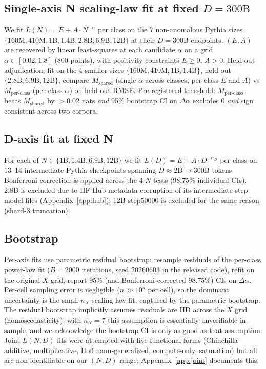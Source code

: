 \documentclass[10pt]{article}
\newcommand{\dalpha}{\Delta\alpha}
\newcommand{\Mp}{M_\mathrm{per\text{-}class}}
\newcommand{\Ms}{M_\mathrm{shared}}
\begin{document}
\subsection{Single-axis N scaling-law fit at fixed $D{=}300\text{B}$}

We fit $L(N) = E + A \cdot N^{-\alpha}$ per class on the 7
non-anomalous Pythia sizes $\{160\text{M}, 410\text{M}, 1\text{B},
1.4\text{B}, 2.8\text{B}, 6.9\text{B}, 12\text{B}\}$ at their
$D{=}300\text{B}$ endpoints. $(E, A)$ are recovered by linear
least-squares at each candidate $\alpha$ on a grid
$\alpha \in [0.02, 1.8]$ (800 points), with positivity constraints
$E \geq 0$, $A > 0$. Held-out adjudication: fit on the 4 smaller
sizes $\{160\text{M}, 410\text{M}, 1\text{B}, 1.4\text{B}\}$, hold
out $\{2.8\text{B}, 6.9\text{B}, 12\text{B}\}$, compare $\Ms$
(single $\alpha$ across classes, per-class $E$ and $A$) vs $\Mp$
(per-class $\alpha$) on held-out RMSE. Pre-registered threshold:
$\Mp$ beats $\Ms$ by $> 0.02$ nats \emph{and} 95\% bootstrap CI on
$\dalpha$ excludes 0 \emph{and} sign consistent across two corpora.

\subsection{D-axis fit at fixed N}
\label{sec:dfit}

For each of $N \in \{1\text{B}, 1.4\text{B}, 6.9\text{B},
12\text{B}\}$ we fit $L(D) = E + A \cdot D^{-\alpha_D}$ per class on
13--14 intermediate Pythia checkpoints spanning $D \approx 2\text{B}
\to 300\text{B}$ tokens. Bonferroni correction is applied across the
4 $N$ tests (98.75\% individual CIs). 2.8B is excluded due to HF Hub
metadata corruption of its intermediate-step model files
(Appendix~\ref{app:hub}); 12B step50000 is excluded for the same
reason (shard-3 truncation).

\subsection{Bootstrap}
\label{sec:bootstrap}

Per-axis fits use parametric residual bootstrap: resample residuals
of the per-class power-law fit ($B = 2000$ iterations, seed
$20260603$ in the released code), refit on the original $X$ grid,
report 95\% (and Bonferroni-corrected 98.75\%) CIs on $\dalpha$.
Per-cell sampling error is negligible ($n \gg 10^5$ per cell), so the
dominant uncertainty is the small-$n_X$ scaling-law fit, captured by
the parametric bootstrap. The residual bootstrap implicitly assumes
residuals are IID across the $X$ grid (homoscedasticity); with
$n_N = 7$ this assumption is essentially unverifiable in-sample, and
we acknowledge the bootstrap CI is only as good as that assumption.
Joint $L(N, D)$ fits were attempted with five functional forms
(Chinchilla-additive, multiplicative, Hoffmann-generalized,
compute-only, saturation) but all are non-identifiable on our
$(N, D)$ range; Appendix~\ref{app:joint} documents this.
\end{document}
